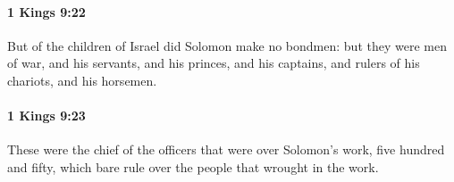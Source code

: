 		\paragraph{1 Kings 9:22} %
			\label{1KINGS-9-22}

			But of the children of Israel did Solomon make no bondmen: but they were men of war, and his servants, and his princes, and his captains, and rulers of his chariots, and his horsemen.


		\paragraph{1 Kings 9:23} %
			\label{1KINGS-9-23}

			These were the chief of the officers that were over Solomon’s work, five hundred and fifty, which bare rule over the people that wrought in the work.


